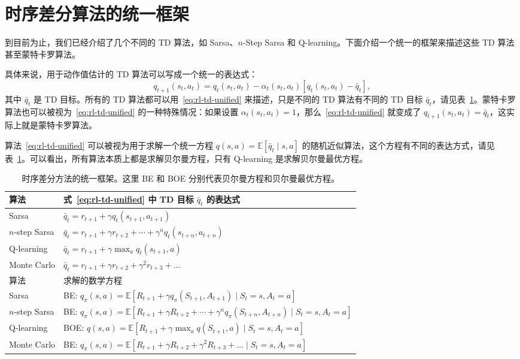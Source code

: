 \section{时序差分算法的统一框架}
\label{sec:rl-td-unified}

到目前为止，我们已经介绍了几个不同的 TD 算法，如 Sarsa、$n$-Step Sarsa 和 Q-learning。下面介绍一个统一的框架来描述这些 TD 算法甚至蒙特卡罗算法。

具体来说，用于动作值估计的 TD 算法可以写成一个统一的表达式：
\begin{equation}
  q_{t+1}(s_t, a_t) = q_t(s_t, a_t) - \alpha_t(s_t, a_t) [q_t(s_t, a_t) - \bar{q}_t],
  \label{eq:rl-td-unified}
\end{equation}
其中 $\bar{q}_t$ 是 TD 目标。所有的 TD 算法都可以用~\eqref{eq:rl-td-unified} 来描述，只是不同的 TD 算法有不同的 TD 目标 $\bar{q}_t$，请见表~\ref{tab:rl-td-unified}。蒙特卡罗算法也可以被视为~\eqref{eq:rl-td-unified} 的一种特殊情况：如果设置 $\alpha_t(s_t, a_t) = 1$，那么~\eqref{eq:rl-td-unified} 就变成了 $q_{t+1}(s_t, a_t) = \bar{q}_t$，这实际上就是蒙特卡罗算法。

算法~\eqref{eq:rl-td-unified} 可以被视为用于求解一个统一方程 $q(s, a) = \mathbb{E}[\bar{q}_t \mid s, a]$ 的随机近似算法，这个方程有不同的表达方式，请见表~\ref{tab:rl-td-unified}。可以看出，所有算法本质上都是求解贝尔曼方程，只有 Q-learning 是求解贝尔曼最优方程。

\begin{table}[H]\centering
\caption{时序差分方法的统一框架。这里 BE 和 BOE 分别代表贝尔曼方程和贝尔曼最优方程。}
\label{tab:rl-td-unified}
\renewcommand{\arraystretch}{1.4}
\begin{tabular}{ll}
\toprule
算法 & 式~\eqref{eq:rl-td-unified} 中 TD 目标 $\bar{q}_t$ 的表达式 \\
\midrule
Sarsa & $\bar{q}_t = r_{t+1} + \gamma q_t(s_{t+1}, a_{t+1})$ \\
$n$-step Sarsa & $\bar{q}_t = r_{t+1} + \gamma r_{t+2} + \cdots + \gamma^n q_t(s_{t+n}, a_{t+n})$ \\
Q-learning & $\bar{q}_t = r_{t+1} + \gamma \max_a q_t(s_{t+1}, a)$ \\
Monte Carlo & $\bar{q}_t = r_{t+1} + \gamma r_{t+2} + \gamma^2 r_{t+3} + \ldots$ \\
\midrule
算法 & 求解的数学方程 \\
\midrule
Sarsa & BE: $q_{\pi}(s, a) = \mathbb{E}\left[ R_{t+1} + \gamma q_{\pi}(S_{t+1}, A_{t+1}) \mid S_t = s, A_t = a \right]$ \\
$n$-step Sarsa & BE: $q_{\pi}(s, a) = \mathbb{E}[R_{t+1} + \gamma R_{t+2} + \cdots + \gamma^n q_{\pi}(S_{t+n}, A_{t+n}) \mid S_t = s, A_t = a]$ \\
Q-learning & BOE: $q(s, a) = \mathbb{E}\left[ R_{t+1} + \gamma \max_a q(S_{t+1}, a) \mid S_t = s, A_t = a \right]$ \\
Monte Carlo & BE: $q_{\pi}(s, a) = \mathbb{E}[R_{t+1} + \gamma R_{t+2} + \gamma^2 R_{t+3} + \ldots \mid S_t = s, A_t = a]$ \\
\bottomrule
\end{tabular}
\end{table}

